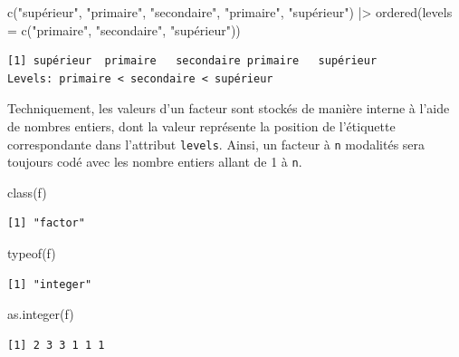 \documentclass[
  letterpaper,
  DIV=11,
  numbers=noendperiod,
  oneside]{scrreprt}
\newenvironment{Shaded}{\begin{snugshade}}{\end{snugshade}}
\newcommand{\AttributeTok}[1]{\textcolor[rgb]{0.40,0.45,0.13}{#1}}
\newcommand{\FunctionTok}[1]{\textcolor[rgb]{0.28,0.35,0.67}{#1}}
\newcommand{\NormalTok}[1]{\textcolor[rgb]{0.00,0.23,0.31}{#1}}
\newcommand{\SpecialCharTok}[1]{\textcolor[rgb]{0.37,0.37,0.37}{#1}}
\newcommand{\StringTok}[1]{\textcolor[rgb]{0.13,0.47,0.30}{#1}}
\begin{document}
\begin{Shaded}
\begin{Highlighting}[]
\FunctionTok{c}\NormalTok{(}\StringTok{"supérieur"}\NormalTok{, }\StringTok{"primaire"}\NormalTok{, }\StringTok{"secondaire"}\NormalTok{, }\StringTok{"primaire"}\NormalTok{, }\StringTok{"supérieur"}\NormalTok{) }\SpecialCharTok{|\textgreater{}} 
  \FunctionTok{ordered}\NormalTok{(}\AttributeTok{levels =} \FunctionTok{c}\NormalTok{(}\StringTok{"primaire"}\NormalTok{, }\StringTok{"secondaire"}\NormalTok{, }\StringTok{"supérieur"}\NormalTok{))}
\end{Highlighting}
\end{Shaded}

\begin{verbatim}
[1] supérieur  primaire   secondaire primaire   supérieur 
Levels: primaire < secondaire < supérieur
\end{verbatim}

Techniquement, les valeurs d'un facteur sont stockés de manière interne
à l'aide de nombres entiers, dont la valeur représente la position de
l'étiquette correspondante dans l'attribut \texttt{levels}. Ainsi, un
facteur à \texttt{n} modalités sera toujours codé avec les nombre
entiers allant de 1 à \texttt{n}.

\begin{Shaded}
\begin{Highlighting}[]
\FunctionTok{class}\NormalTok{(f)}
\end{Highlighting}
\end{Shaded}

\begin{verbatim}
[1] "factor"
\end{verbatim}

\begin{Shaded}
\begin{Highlighting}[]
\FunctionTok{typeof}\NormalTok{(f)}
\end{Highlighting}
\end{Shaded}

\begin{verbatim}
[1] "integer"
\end{verbatim}

\begin{Shaded}
\begin{Highlighting}[]
\FunctionTok{as.integer}\NormalTok{(f)}
\end{Highlighting}
\end{Shaded}

\begin{verbatim}
[1] 2 3 3 1 1 1
\end{verbatim}
\end{document}
